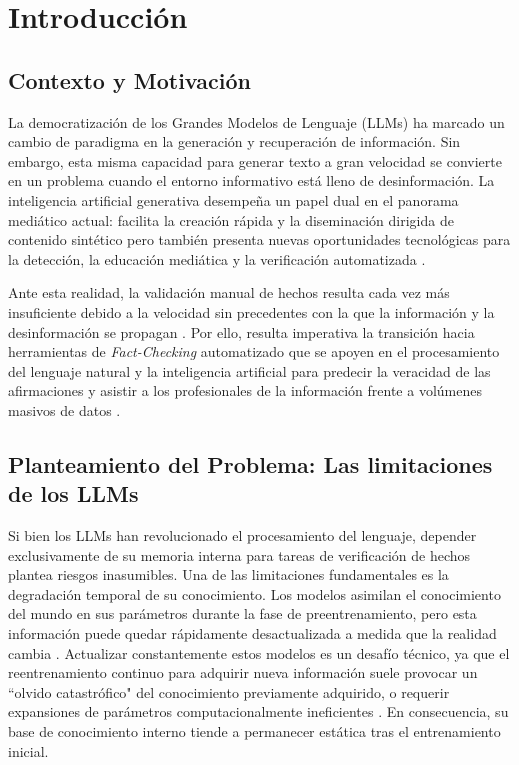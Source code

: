 

\chapter{Introducción}

\section{Contexto y Motivación}

La democratización de los Grandes Modelos de Lenguaje (LLMs) ha marcado un cambio de paradigma en la generación y recuperación de información. Sin embargo, esta misma capacidad para generar texto a gran velocidad se convierte en un problema cuando el entorno informativo está lleno de desinformación. La inteligencia artificial generativa desempeña un papel dual en el panorama mediático actual: facilita la creación rápida y la diseminación dirigida de contenido sintético pero también presenta nuevas oportunidades tecnológicas para la detección, la educación mediática y la verificación automatizada \cite{mencia2025mapping}.

Ante esta realidad, la validación manual de hechos resulta cada vez más insuficiente debido a la velocidad sin precedentes con la que la información y la desinformación se propagan \cite{guo2022survey}. Por ello, resulta imperativa la transición hacia herramientas de \textit{Fact-Checking} automatizado que se apoyen en el procesamiento del lenguaje natural y la inteligencia artificial para predecir la veracidad de las afirmaciones y asistir a los profesionales de la información frente a volúmenes masivos de datos \cite{guo2022survey}.

\section{Planteamiento del Problema: Las limitaciones de los LLMs}

Si bien los LLMs han revolucionado el procesamiento del lenguaje, depender exclusivamente de su memoria interna para tareas de verificación de hechos plantea riesgos inasumibles. Una de las limitaciones fundamentales es la degradación temporal de su conocimiento. Los modelos asimilan el conocimiento del mundo en sus parámetros durante la fase de preentrenamiento, pero esta información puede quedar rápidamente desactualizada a medida que la realidad cambia \cite{jang2022towards}. Actualizar constantemente estos modelos es un desafío técnico, ya que el reentrenamiento continuo para adquirir nueva información suele provocar un ``olvido catastrófico" del conocimiento previamente adquirido, o requerir expansiones de parámetros computacionalmente ineficientes \cite{jang2022towards}. En consecuencia, su base de conocimiento interno tiende a permanecer estática tras el entrenamiento inicial.

